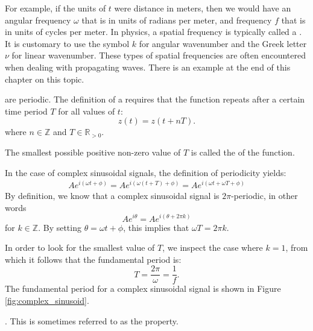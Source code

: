 For example, if the units of $t$ were distance in meters,
then we would have an angular frequency $\omega$ that is in units
of radians per meter, and frequency $f$ that is in units of cycles per meter.
In physics, a spatial frequency is typically called a \emph{}.
It is customary to use the symbol $k$ for angular wavenumber and the Greek letter $\nu$ for
linear wavenumber. These types of spatial frequencies are often encountered when dealing
with propagating waves. There is an example at the end of this chapter on this topic.

 are periodic.
The definition of a  requires that the
function repeats after a certain time period $T$ for all values of $t$:
\begin{equation}
  \boxed{z(t) = z(t+ n T).}
\end{equation}
where $n \in \mathbb{Z}$ and $T \in \mathbb{R}_{>0}$.

The smallest possible positive non-zero value of $T$ is called
the \emph{} of the function.

In the case of complex sinusoidal signals, the definition of periodicity yields:
\begin{align}
  Ae^{i (\omega t + \phi)}= Ae^{i (\omega (t+T) + \phi)} = Ae^{i (\omega t+ \omega T + \phi)}
\end{align}
By definition, we know that a complex sinusoidal signal is
$2\pi$-periodic, in other words
\begin{equation}
  Ae^{i\theta}=Ae^{i(\theta+2\pi k)}
\end{equation}
for $k\in\mathbb{Z}$. By setting $\theta = \omega t +\phi$, this implies that $\omega T = 2\pi k$.

In order to look for the smallest value of $T$, we inspect the case where $k=1$,
from which it follows that the fundamental period is:
\begin{equation}
  \boxed{T = \frac{2\pi}{\omega} = \frac{1}{f}.}
\end{equation}
The fundamental period for a complex sinusoidal signal is shown in Figure \ref{fig:complex_sinusoid}.

.
This is sometimes referred to as the
\emph{} property.

